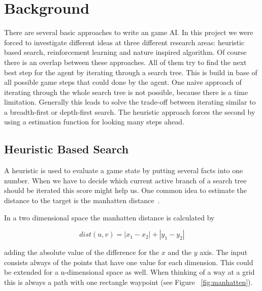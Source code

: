 

\section{Background} 
\label{sec:back}

There are several basic approaches to write an game AI. In this project we were forced to investigate different ideas at three different research areas: heuristic based search, reinforcement learning and nature inspired algorithm. 
Of course there is an overlap between these approaches. All of them try to find the next best step for the agent by iterating through a search tree. This is build in base of all possible game steps that could done by the agent.
One naive approach of iterating through the whole search tree is not possible, because there is a time limitation.
Generally this leads to solve the trade-off between iterating similar to a breadth-first or depth-first search.
The heuristic approach forces the second by using a estimation function for looking many steps ahead.


\subsection{Heuristic Based Search} 

A heuristic is used to evaluate a game state by putting several facts into one number. When we have to decide which current active branch of a search tree should be iterated this score might help us. 
One common idea to estimate the distance to the target is the manhatten distance~\cite{distance_metrics}. 

In a two dimensional space the manhatten distance is calculated by

\begin{equation}
dist(u,v) = |x_{1} - x_{2}| + |y_{1} - y_{2}|
\end{equation}

adding the absolute value of the difference for the $x$ and the $y$ axis. The input consists always of the points that have one value for each dimension. This could be extended for a n-dimensional space as well. When thinking of a way at a grid this is always a path with one rectangle waypoint (see Figure ~\ref{fig:manhatten}).

